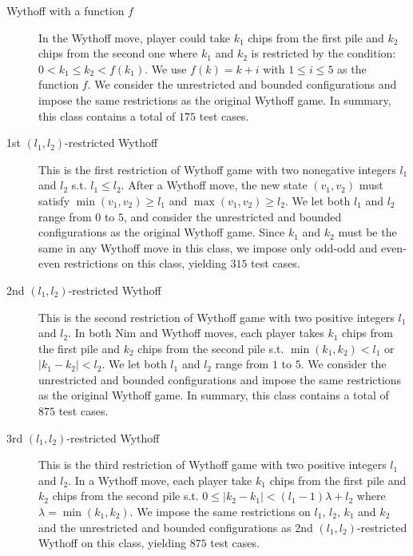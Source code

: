 \documentclass[review]{elsarticle}
\begin{document}
\begin{description}
	\item[Wythoff with a function $f$]
	In the Wythoff move, player could take $k_1$ chips from the first pile and $k_2$ chips from the second one where $k_1$ and $k_2$ is restricted by the condition: $0 < k_1 \leq k_2 < f(k_1)$.
	We use $f(k) = k + i$ with $1 \leq i \leq 5$ as the function $f$.
	We consider the unrestricted and bounded configurations and impose the same restrictions as the original Wythoff game.
	In summary, this class contains a total of $175$ test cases.
	
	\item[1st $(l_1, l_2)$-restricted Wythoff]
	This is the first restriction of Wythoff game with two nonegative integers $l_1$ and $l_2$ s.t. $l_1 \le l_2$.
	After a Wythoff move, the new state $(v_1, v_2)$ must satisfy $\min(v_1, v_2) \ge l_1$ and $\max(v_1, v_2) \ge l_2$.
	We let both $l_1$ and $l_2$ range from $0$ to $5$, and consider the unrestricted and bounded configurations as the original Wythoff game.
	Since $k_1$ and $k_2$ must be the same in any Wythoff move in this class, we impose only odd-odd and even-even restrictions on this class, yielding $315$ test cases.
	
	\item[2nd $(l_1, l_2)$-restricted Wythoff]
	This is the second restriction of Wythoff game with two positive integers $l_1$ and $l_2$.
	In both Nim and Wythoff moves, each player takes $k_1$ chips from the first pile and $k_2$ chips from the second pile s.t. $\min(k_1, k_2) < l_1$ or $|k_1 - k_2| < l_2$.
	We let both $l_1$ and $l_2$ range from $1$ to $5$.
	We consider the unrestricted and bounded configurations and impose the same restrictions as the original Wythoff game.
	In summary, this class contains a total of $875$ test cases.
	
	\item[3rd $(l_1, l_2)$-restricted Wythoff]
	This is the third restriction of Wythoff game with two positive integers $l_1$ and $l_2$.
	In a Wythoff move, each player take $k_1$ chips from the first pile and $k_2$ chips from the second pile s.t. $0 \le |k_2 - k_1| < (l_1 - 1) \lambda + l_2$ where $\lambda = \min(k_1, k_2)$.
	We impose the same restrictions on $l_1$, $l_2$, $k_1$ and $k_2$ and the unrestricted and bounded configurations as 2nd $(l_1, l_2)$-restricted Wythoff on this class, yielding $875$ test cases.
	

\end{description}
\end{document}
